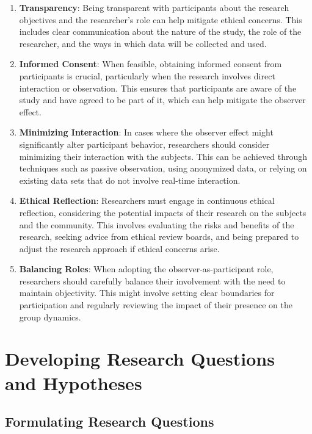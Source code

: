 \documentclass[
]{book}
\begin{document}
\begin{enumerate}
\def\labelenumi{\arabic{enumi}.}
\item
  \textbf{Transparency}: Being transparent with participants about the research objectives and the researcher's role can help mitigate ethical concerns. This includes clear communication about the nature of the study, the role of the researcher, and the ways in which data will be collected and used.
\item
  \textbf{Informed Consent}: When feasible, obtaining informed consent from participants is crucial, particularly when the research involves direct interaction or observation. This ensures that participants are aware of the study and have agreed to be part of it, which can help mitigate the observer effect.
\item
  \textbf{Minimizing Interaction}: In cases where the observer effect might significantly alter participant behavior, researchers should consider minimizing their interaction with the subjects. This can be achieved through techniques such as passive observation, using anonymized data, or relying on existing data sets that do not involve real-time interaction.
\item
  \textbf{Ethical Reflection}: Researchers must engage in continuous ethical reflection, considering the potential impacts of their research on the subjects and the community. This involves evaluating the risks and benefits of the research, seeking advice from ethical review boards, and being prepared to adjust the research approach if ethical concerns arise.
\item
  \textbf{Balancing Roles}: When adopting the observer-as-participant role, researchers should carefully balance their involvement with the need to maintain objectivity. This might involve setting clear boundaries for participation and regularly reviewing the impact of their presence on the group dynamics.
\end{enumerate}

\chapter{Developing Research Questions and Hypotheses}\label{developing-research-questions-and-hypotheses}

\section{Formulating Research Questions}\label{formulating-research-questions}
\end{document}
